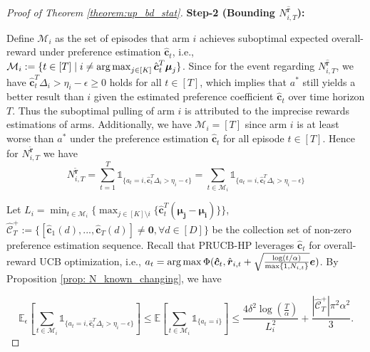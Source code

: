 \begin{proof}[Proof of Theorem \ref{theorem:up_bd_stat}]
\textbf{Step-2 (Bounding $N_{i,T}^{\hat{\boldsymbol{r}}}$):}

Define $\mathcal{M}_i$ as the set of episodes that arm $i$ achieves suboptimal expected overall-reward under preference estimation $\hat{\boldsymbol{c}}_t$, i.e., 
$\mathcal{M}_i := \{ t \in [T] \mid i \neq \operatorname*{arg\,max}_{j \in [K]} \hat{\boldsymbol{c}}_t^T \boldsymbol{\mu}_j \}$.
Since for the event regarding $N_{i,T}^{\hat{\boldsymbol{r}}}$, we have $\hat{\boldsymbol{c}}_{t}^{T} \Delta_{i} > \eta_i - \epsilon \geq 0$ holds for all $t \in [T]$, which implies that $a^{*}$ still yields a better result than $i$ given the estimated preference coefficient $\hat{\boldsymbol{c}}_{t}$ over time horizon $T$.
Thus the suboptimal pulling of arm $i$ is attributed to the imprecise rewards estimations of arms. 
Additionally, we have $\mathcal{M}_i = [T]$ since arm $i$ is at least worse than $a^*$ under the preference estimation $\hat{\boldsymbol{c}}_{t}$ for all episode $t \in [T]$. Hence for $N_{i,T}^{\widetilde{\boldsymbol{r}}}$ we have
\begin{equation}
N_{i,T}^{\widetilde{\boldsymbol{r}}} = 
\sum_{t=1}^{T} \mathds{1}_{\{a_t = i, \hat{\boldsymbol{c}}_{t}^{T} \Delta_{i} > \eta_{i} - \epsilon\}}
=
\sum_{t \in \mathcal{M}_i} \mathds{1}_{\{a_t = i, \hat{\boldsymbol{c}}_{t}^{T} \Delta_{i} > \eta_{i} - \epsilon\}}
\end{equation}

Let $L_i = \min_{t \in \mathcal{M}_i} \{ \max_{j \in [K] \setminus i } \{\hat{\boldsymbol{c}}_t^T (\boldsymbol{\boldsymbol{\mu}_j - \boldsymbol{\mu}_{i} } )\} \}$, 
$\hat{\mathcal{C}}^{+}_{T}:= \{ [\boldsymbol{\hat{c}}_{1}(d), ..., \boldsymbol{\hat{c}}_{T}(d)] \neq \boldsymbol{0}, \forall d \in [D]\}$ be the collection set of non-zero preference estimation sequence. 
Recall that PRUCB-HP leverages $\boldsymbol{\hat{c}}_t$ for overall-reward UCB optimization, i.e., $a_t = \operatorname*{arg\,max} \Phi( \boldsymbol{\hat{c}}_t, \hat{\boldsymbol{r}}_{i,t}+\sqrt{\frac{ \log(t/\alpha)}{\max \{1, N_{i, t } \} }} \boldsymbol{e})$.
By Proposition \ref{prop: N_known_changing}, we have 

\begin{equation}
\label{eq:N_unkown_stat}
\mathbb{E}_{\epsilon} \left[ \sum_{t \in \mathcal{M}_i} \mathds{1}_{\{a_t = i, \hat{\boldsymbol{c}}_{t}^{T} \Delta_{i} > \eta_{i} - \epsilon\}} \right] 
\leq
\mathbb{E} \left[ \sum_{t \in \mathcal{M}_i} \mathds{1}_{\{a_t = i \} } 
\right] 
\leq
\frac{4 \delta^2 \log{(\frac{T}{\alpha})}}{L_i^2}
+
\frac{ |\hat{\mathcal{C}}^{+}_{T}| \pi^2 \alpha^2 } {3}.
\end{equation}


\end{proof}
